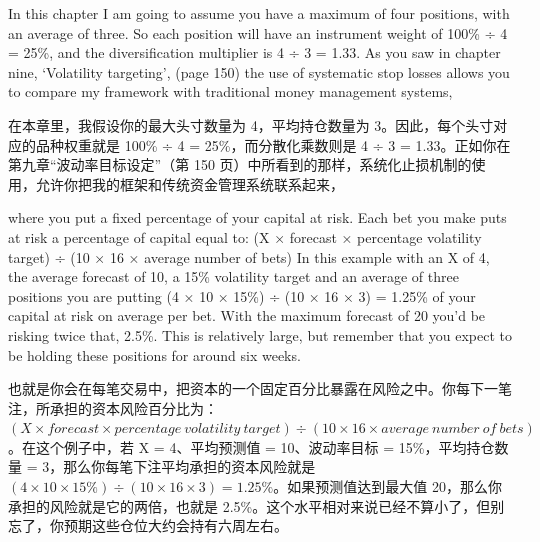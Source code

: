 \bipairgap

\begin{englishblock} In this chapter I am going to assume you have a maximum of four positions, with an average of three. So each position will have an instrument weight of 100\% ÷ 4 = 25\%, and the diversification multiplier is 4 ÷ 3 = 1.33. As you saw in chapter nine, ‘Volatility targeting', (page 150) the use of systematic stop losses allows you to compare my framework with traditional money management systems, \end{englishblock}

\begin{chineseblock}在本章里，我假设你的最大头寸数量为 4，平均持仓数量为 3。因此，每个头寸对应的品种权重就是 100\% ÷ 4 = 25\%，而分散化乘数则是 4 ÷ 3 = 1.33。正如你在第九章“波动率目标设定”（第 150 页）中所看到的那样，系统化止损机制的使用，允许你把我的框架和传统资金管理系统联系起来，\end{chineseblock}

\bipairgap

\begin{englishblock} where you put a fixed percentage of your capital at risk. Each bet you make puts at risk a percentage of capital equal to: (X × forecast × percentage volatility target) ÷ (10 × 16 × average number of bets) In this example with an X of 4, the average forecast of 10, a 15\% volatility target and an average of three positions you are putting (4 × 10 × 15\%) ÷ (10 × 16 × 3) = 1.25\% of your capital at risk on average per bet. With the maximum forecast of 20 you'd be risking twice that, 2.5\%. This is relatively large, but remember that you expect to be holding these positions for around six weeks. \end{englishblock}

\begin{chineseblock}也就是你会在每笔交易中，把资本的一个固定百分比暴露在风险之中。你每下一笔注，所承担的资本风险百分比为：\((X \times forecast \times percentage\ volatility\ target) \div (10 \times 16 \times average\ number\ of\ bets)\)。在这个例子中，若 X = 4、平均预测值 = 10、波动率目标 = 15\%，平均持仓数量 = 3，那么你每笔下注平均承担的资本风险就是\((4 \times 10 \times 15\%) \div (10 \times 16 \times 3) = 1.25\%\)。如果预测值达到最大值 20，那么你承担的风险就是它的两倍，也就是 2.5\%。这个水平相对来说已经不算小了，但别忘了，你预期这些仓位大约会持有六周左右。\end{chineseblock}


